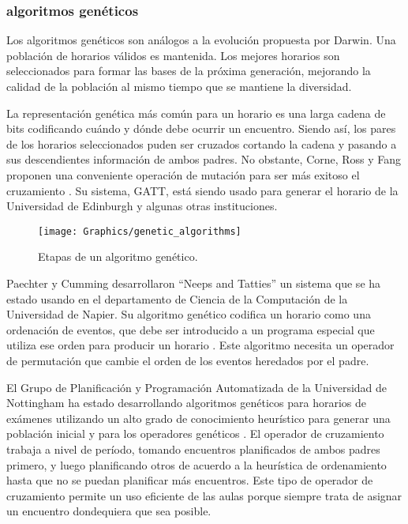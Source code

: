 \subsubsection{algoritmos genéticos}

Los algoritmos genéticos son análogos a la evolución propuesta por Darwin. Una población de horarios válidos
es mantenida. Los mejores horarios son seleccionados para formar las bases de la próxima generación, mejorando
la calidad de la población al mismo tiempo que se mantiene la diversidad.

La representación genética más común para un horario es una larga cadena de bits codificando cuándo y dónde
debe ocurrir un encuentro. Siendo así, los pares de los horarios seleccionados puden ser cruzados cortando
la cadena y pasando a sus descendientes información de ambos padres. No obstante, Corne, Ross y Fang proponen
una conveniente operación de mutación para ser más exitoso el cruzamiento \cite{D Corne and P Ross and HL Fang}.
Su sistema, GATT, está siendo usado para generar el horario de la Universidad de Edinburgh y algunas otras
instituciones.

\begin{figure}
	\begin{center}
		\texttt{[image: Graphics/genetic\_algorithms]}
		\caption{Etapas de un algoritmo genético.}
	\end{center}	
\end{figure}

Paechter y Cumming desarrollaron ``Neeps and Tatties'' un sistema que se ha estado usando en el departamento
de Ciencia de la Computación de la Universidad de Napier. Su algoritmo genético codifica un horario como una ordenación
de eventos, que debe ser introducido a un programa especial que utiliza ese orden para producir un horario
\cite{B Paechter* and A Cumming* and H Luchian}. Este algoritmo necesita un operador de permutación 
que cambie el orden de los eventos heredados por el padre.

El Grupo de Planificación y Programación Automatizada de la Universidad de Nottingham ha estado desarrollando
algoritmos genéticos para horarios de exámenes utilizando un alto grado de conocimiento heurístico para generar
una población inicial y para los operadores genéticos \cite{EK Burke and DG Elliman and RF Weare 1, 
EK Burke and DG Elliman and RF Weare 2, EK Burke and DG Elliman and RF Weare 3}. El operador de cruzamiento
trabaja a nivel de período, tomando encuentros planificados de ambos padres primero, y luego planificando
otros de acuerdo a la heurística de ordenamiento hasta que no se puedan planificar más encuentros. Este tipo de operador de cruzamiento permite un uso eficiente de las aulas porque siempre trata de asignar un encuentro dondequiera que sea posible.


